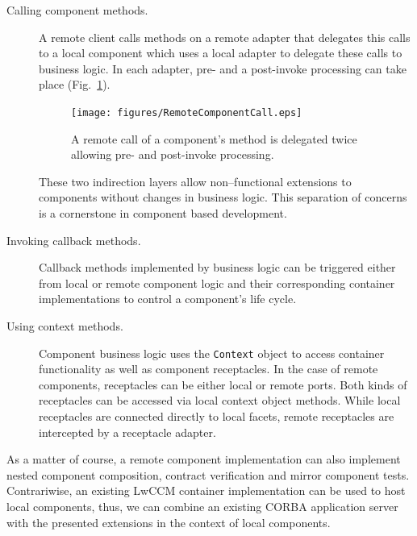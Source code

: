 \begin{description}
\item [Calling component methods.]
A remote client calls methods on a remote adapter that delegates this
calls to a local component which uses a local adapter to delegate these calls
to business logic.
In each adapter, pre- and a post-invoke processing can take place 
(Fig.~\ref{RemoteComponentCall}).
\begin{figure}[htbp]
    \begin{center}
    \texttt{[image: figures/RemoteComponentCall.eps]}
    \caption{A remote call of a component's method is delegated twice
    allowing pre- and post-invoke processing.}
    \label{RemoteComponentCall}            
    \end{center}
\end{figure}

These two indirection layers allow non--functional extensions to 
components without changes in business logic. 
This separation of concerns is a cornerstone in component
based development.

\item [Invoking callback methods.]
Callback methods implemented by business logic can be
triggered either from local or remote component logic and their corresponding
container implementations to control a component's life cycle.



\item [Using context methods.]
Component business logic uses the {\tt Context} object to access container
functionality as well as component receptacles.
In the case of remote components, receptacles can be either local or remote
ports. Both kinds of receptacles can be accessed via local context
object methods. While local receptacles are connected directly to local facets,
remote receptacles are intercepted by a receptacle adapter.

\end{description}

\noindent
As a matter of course, a remote component implementation can also implement
nested component composition, contract verification and mirror component
tests.
Contrariwise, an existing LwCCM container implementation can be used to host 
local components, thus, we can combine an existing CORBA application server with
the presented extensions in the context of local components. 


\newpage

